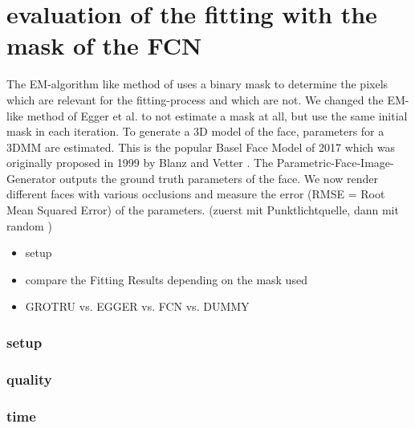 \chapter{evaluation of the fitting with the mask of the FCN}
The EM-algorithm like method of \cite{egger_paper} uses a binary mask to determine the pixels which are relevant for the fitting-process and which are not. We changed the EM-like method of Egger et al. to not estimate a mask at all, but use the same initial mask in each iteration. To generate a 3D model of the face, parameters for a 3DMM are estimated. This is the popular Basel Face Model of 2017 \cite{BFM2017} which was originally proposed in 1999 by Blanz and Vetter \cite{BlanzVetter}. The Parametric-Face-Image-Generator \cite{parametric} outputs the ground truth parameters of the face. We now render different faces with various occlusions and measure the error (RMSE = Root Mean Squared Error) of the parameters. (zuerst mit Punktlichtquelle,  dann mit random \todo)

	\begin{itemize}
		\item setup
		\item compare the Fitting Results depending on the mask used
		\item GROTRU vs. EGGER vs. FCN vs. DUMMY 
	\end{itemize}
\subsection{setup}
\subsection{quality}
\subsection{time}